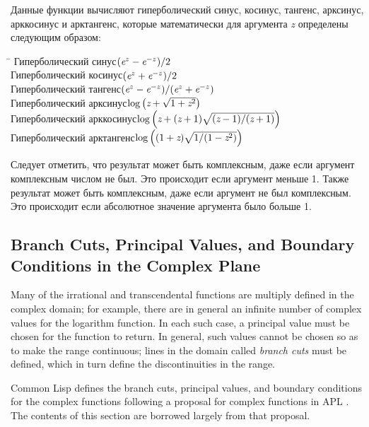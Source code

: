 \begin{defun}[Function]
Данные функции вычисляют гиперболический синус, косинус, тангенс, арксинус,
арккосинус и арктангенс, которые математически для аргумента \emph{z} определены
следующим образом:
\begin{tabbing}
\hskip 10pc\=\kill
Гиперболический синус\>$ (\emph{e}^{z}-\emph{e}^{-z})/2 $ \\
Гиперболический косинус\>$ (\emph{e}^{z}+\emph{e}^{-z})/2 $ \\
Гиперболический тангенс\>$ (\emph{e}^{z}-\emph{e}^{-z})/(\emph{e}^{z}+\emph{e}^{-z}) $ \\[2pt]
Гиперболический арксинус\>$ \log \left(\emph{z}+\sqrt{1+\emph{z}^2}\right) $ \\[2pt]
Гиперболический арккосинус\>$ \log
\left(\emph{z}+(\emph{z}+1)\sqrt{(\emph{z}-1)/(\emph{z}+1)}\right) $ \\[2pt]
Гиперболический арктангенс\>$ \log \left((1+\emph{z})\sqrt{1/(1-\emph{z}^2)}\right) $
\end{tabbing}

Следует отметить, что результат  может быть комплексным, даже если
аргумент комплексным числом не был. Это происходит если аргумент меньше 1.
Также результат  может быть комплексным, даже если аргумент не был
комплексным. Это происходит если абсолютное значение аргумента было больше 1.
\end{defun}

\subsection{Branch Cuts, Principal Values, and Boundary Conditions in the Complex Plane}
\label{BRANCH-CUTS-SECTION}


Many of the irrational and transcendental functions are multiply defined
in the complex domain; for example, there are in general an infinite
number of complex values for the logarithm function.  In each such
case, a principal value must be chosen for the function to return.
In general, such values cannot be chosen so as to make the range
continuous; lines in the domain
called \emph{branch cuts} must be defined, which in turn
define the discontinuities in the range.

Common Lisp defines the branch cuts, principal values, and boundary
conditions for the complex functions following
a proposal for complex functions in APL \cite{APL-BRANCH-CUTS}.
The contents of this section are borrowed largely from that proposal.

